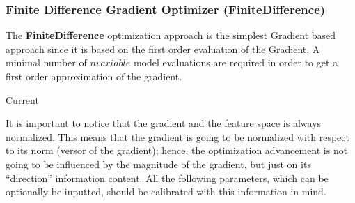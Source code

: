\subsubsection{Finite Difference Gradient Optimizer (FiniteDifference)}
\label{subsubsubsec:FiniteDifference}
The \textbf{FiniteDifference} optimization approach is  the simplest Gradient based approach since it is based on the
first order evaluation of the Gradient.  A minimal number of $n variable$
model evaluations are required in order to get a first order approximation of the gradient.

Current 

It is important to notice that the gradient and the feature space is always normalized. This means that the gradient is going to be
normalized with respect to its norm (versor of the gradient); hence, the optimization advancement is not going to be influenced by the
magnitude of the gradient, but just on its ``direction'' information content. All the following parameters, which can be optionally be inputted, should be calibrated with this information in mind.
%

